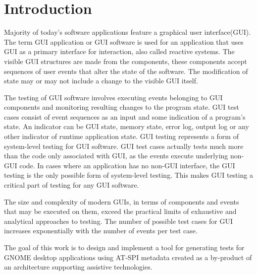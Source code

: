 

\chapter{Introduction}
Majority of today's software applications feature a graphical user interface(GUI). The term GUI application or GUI software is used for an application that uses GUI as a primary interface for interaction, also called reactive systems. The visible GUI structures are made from the components, these components accept sequences of user events that alter the state of the software. The modification of state may or may not include a change to the visible GUI itself. 

The testing of GUI software involves executing events belonging to GUI components and monitoring resulting changes to the program state. GUI test cases consist of event sequences as an input and some indication of a program's state. An indicator can be GUI state, memory state, error log, output log or any other indicator of runtime application state. GUI testing represents a form of system-level testing for GUI software. GUI test cases actually tests much more than the code only associated with GUI, as the events execute underlying non-GUI code. In cases where an application has no non-GUI interface, the GUI testing is the only possible form of system-level testing. This makes GUI testing a critical part of testing for any GUI software.

The size and complexity of modern GUIs, in terms of components and events that may be executed on them, exceed the practical limits of exhaustive and analytical approaches to testing. The number of possible test cases for GUI increases exponentially with the number of events per test case.\cite{NguyenBao2014Gait}

The goal of this work is to design and implement a tool for generating tests for GNOME desktop applications using AT-SPI metadata created as a by-product of an architecture supporting assistive technologies.


